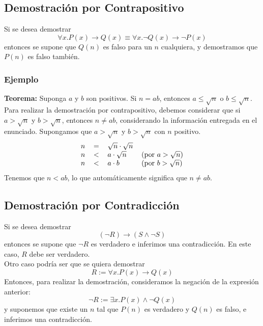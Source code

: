 \documentclass[../main.tex]{subfiles}
\begin{document}
\subsection{Demostración por Contrapositivo}
Si se desea demostrar
\[ \forall x . P(x) \rightarrow Q(x) \equiv \forall x. \neg Q(x) \rightarrow \neg P(x) \]
entonces se supone que $Q(n)$ es falso para un $n$ cualquiera, y demostramos que $P(n)$ es falso también.
\subsubsection*{Ejemplo}
\textbf{Teorema:} Suponga $a$ y $b$ son positivos. Si $n = ab$, entonces $a \leq \sqrt{n}$ o $b \leq \sqrt{n}$.\\
Para realizar la demostración por contrapositivo, debemos considerar que si $a > \sqrt{n}$ y $b > \sqrt{n}$, entonces $n \not= ab$, considerando la información entregada en el enunciado. Supongamos que $a > \sqrt{n}$ y $b > \sqrt{n}$ con $n$ positivo.\\
\[
    \begin{tabular}{rcll}
        $n$ & $=$ & $\sqrt{n} \cdot \sqrt{n}$\\
        $n$ & $<$ & $a \cdot \sqrt{n}$ & (por $a > \sqrt{n}$)\\
        $n$ & $<$ & $a \cdot b$ & (por $b > \sqrt{n}$)\\
    \end{tabular}
\]
Tenemos que $n < ab$, lo que automáticamente significa que $n \not= ab$.

\subsection{Demostración por Contradicción}
Si se desea demostrar
\[ (\neg R) \rightarrow (S \wedge \neg S) \]
entonces se supone que $\neg R$ es verdadero e inferimos una contradicción. En este caso, $R$ debe ser verdadero.\\
Otro caso podría ser que se quiera demostrar
\[ R := \forall x . P(x) \rightarrow Q(x) \]
Entonces, para realizar la demostración, consideramos la negación de la expresión anterior:
\[ \neg R := \exists x . P(x) \wedge \neg Q(x) \]
y suponemos que existe un $n$ tal que $P(n)$ es verdadero y $Q(n)$ es falso, e inferimos una contradicción.
\end{document}
